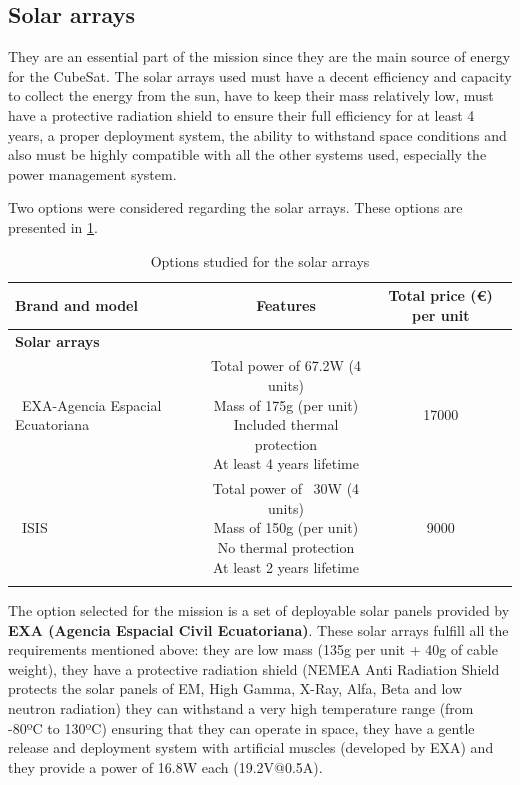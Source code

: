 \subsection{Solar arrays}
They are an essential part of the mission since they are the main source of energy for the CubeSat. The solar arrays used must have a decent efficiency and capacity to collect the energy from the sun, have to keep their mass relatively low, must have a protective radiation shield to ensure their full efficiency for at least 4 years, a proper deployment system, the ability to withstand space conditions and also must be highly compatible with all the other systems used, especially the power management system.

Two options were considered regarding the solar arrays. These options are presented in \ref{solararraysoptions}.

\begin{longtable}{| l | c | c | }
\hline
\rowcolor[gray]{0.80}	\textbf{Brand and model} &  \textbf{Features}     & \textbf{Total price (\euro) per unit}   \\
\hline
\endfirsthead

\rowcolor[gray]{0.85} \textbf{Solar arrays} &  &  \\
	   ~EXA-Agencia Espacial Ecuatoriana & \makecell{Total power of 67.2W (4 units)\\ Mass of 175g (per unit) \\ Included thermal protection \\At least 4 years lifetime} & 17000 \\
	   \hline
	   ~ISIS & \makecell{Total power of ~30W (4 units) \\ Mass of 150g (per unit) \\ No thermal protection \\At least 2 years lifetime} & 9000 \\
	   \hline
\caption{Options studied for the solar arrays}
\label{solararraysoptions}
\end{longtable}

The option selected for the mission is a set of deployable solar panels provided by \textbf{EXA (Agencia Espacial Civil Ecuatoriana)}. These solar arrays fulfill all the requirements mentioned above: they are low mass (135g per unit + 40g of cable weight), they have a protective radiation shield (NEMEA Anti Radiation Shield protects the solar panels of EM, High Gamma, X-Ray, Alfa, Beta and low neutron radiation) they can withstand a very high temperature range (from -80ºC to 130ºC) ensuring that they can operate in space, they have a gentle release and deployment system with artificial muscles (developed by EXA) and they provide a power of 16.8W each (19.2V@0.5A).

